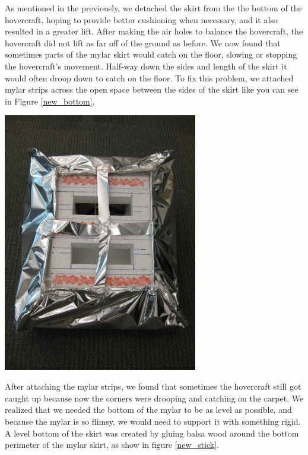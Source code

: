As mentioned in the previously, we detached the skirt from the the bottom of the hovercraft, hoping to provide
better cushioning when necessary, and it also resulted in a greater lift. After making the air holes to balance
the hovercraft, the hovercraft did not lift as far off of the ground as before. We now found that sometimes parts
of the mylar skirt would catch on the floor, slowing or stopping the hovercraft's movement. Half-way down the
sides and length of the skirt it would often droop down to catch on the floor. To fix this problem, we attached
mylar strips across the open space between the sides of the skirt like you can see in Figure \ref{new_bottom}.

\begin{center}
  \includegraphics[width=85mm]{imageSources/designProblemsnew_bottom.png}
\end{center}
\label{new_bottom}

After attaching the mylar strips, we found that sometimes the hovercraft still got caught up because now the corners 
were drooping and catching on the carpet. We realized that we needed the bottom of the mylar to be as level as possible, 
and because the mylar is so flimsy, we would need to support it with something rigid. A level bottom of the skirt
was created by gluing balsa wood around the bottom perimeter of the mylar skirt, as show in figure \ref{new_stick}.

